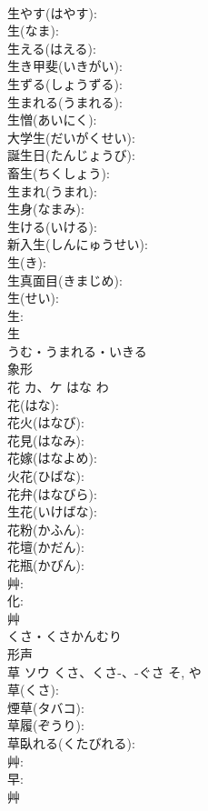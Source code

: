 \documentclass[8pt]{extreport}
\begin{document}
\begin{CJK}{UTF8}{min}
\\	生やす(はやす): 
\\	生(なま): 
\\	生える(はえる): 
\\	生き甲斐(いきがい): 
\\	生ずる(しょうずる): 
\\	生まれる(うまれる): 
\\	生憎(あいにく): 
\\	大学生(だいがくせい): 
\\	誕生日(たんじょうび): 
\\	畜生(ちくしょう): 
\\	生まれ(うまれ): 
\\	生身(なまみ): 
\\	生ける(いける): 
\\	新入生(しんにゅうせい): 
\\	生(き): 
\\	生真面目(きまじめ): 
\\	生(せい): 
\\	生: 
\\	生	
\\	うむ・うまれる・いきる	
\\	象形 
\\	花	カ、ケ	はな	わ	
\\	花(はな): 
\\	花火(はなび): 
\\	花見(はなみ): 
\\	花嫁(はなよめ): 
\\	火花(ひばな): 
\\	花弁(はなびら): 
\\	生花(いけばな): 
\\	花粉(かふん): 
\\	花壇(かだん): 
\\	花瓶(かびん): 
\\	艸: 
\\	化: 
\\	艸	
\\	くさ・くさかんむり	
\\	形声 
\\	草	ソウ	くさ、くさ-、-ぐさ	そ, や	
\\	草(くさ): 
\\	煙草(タバコ): 
\\	草履(ぞうり): 
\\	草臥れる(くたびれる): 
\\	艸: 
\\	早: 
\\	艸	

\end{CJK}
\end{document}
